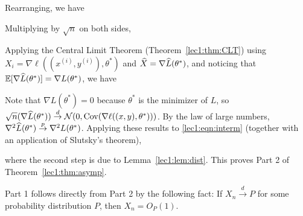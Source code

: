Rearranging, we have


Multiplying by $\sqrt{n}$ on both sides,

 
Applying the Central Limit Theorem (Theorem~\ref{lec1:thm:CLT}) using $X_i = \nabla \ell ((x^{(i)}, y^{(i)}), \theta^*)$ and $\widehat{X} = \nabla \widehat{L}(\theta^*)$, and noticing that $\operatorname*{\mathbb{E}}[\nabla \widehat{L}(\theta^{*})] = \nabla L(\theta^{*})$, we have
 
Note that $\nabla L(\theta^{*}) = 0$ because $\theta^{*}$ is the minimizer of  $L$, so $\sqrt{n} (\nabla \widehat{L}(\theta^{*})) \overset{d}{\to} \mathcal{N}(0,\operatorname{Cov}(\nabla \ell((x, y), \theta^{*})))$. By the law of large numbers, $\nabla^2 \widehat{L}(\theta^*) \stackrel{p}{\rightarrow} \nabla^2 L(\theta^*)$. Applying these results to \eqref{lec1:eqn:interm} (together with an application of Slutsky's theorem),

where the second step is due to Lemma~\ref{lec1:lem:dist}. This proves Part 2 of Theorem~\ref{lec1:thm:asymp}.

Part 1 follows directly from Part 2 by the following fact: If $X_n \stackrel{d}{\rightarrow} P$ for some probability distribution $P$, then $X_n = O_P(1)$.

